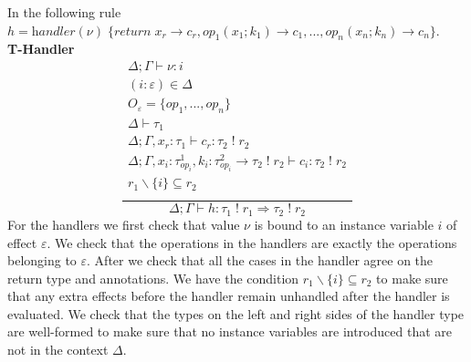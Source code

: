 \documentclass[12pt]{article}
\newcommand\eff[0]{\varepsilon}
\newcommand\Op[0]{O}
\newcommand\op[0]{op}
\newcommand\pty[1]{\ty^1_{#1}}
\newcommand\rty[1]{\ty^2_{#1}}
\newcommand\ty[0]{\tau}
\newcommand\tarr[2]{#1 \rightarrow #2}
\newcommand\thandler[2]{#1 \Rightarrow #2}
\newcommand\aty[2]{#1 \; ! \; #2}
\newcommand\val[0]{\nu}
\newcommand\vhandleri[2]{\textit{handler} ( #1 ) \; \{#2\}}
\newcommand\comp[0]{c}
\begin{document}
\newpage
In the following rule \\$h = 
	\vhandleri{\val}{
		\textit{return} \; x_r \rightarrow \comp_r,
		\op_1(x_1 ; k_1) \rightarrow \comp_1,
		...,
		\op_n(x_n ; k_n) \rightarrow \comp_n
	}$.\\
\textbf{T-Handler}
\[\frac{
	\begin{array}{l}
	\Delta;\Gamma \vdash \val : i \\
	(i:\eff)\in\Delta \\
	\Op_\eff = \{ op_1, ..., op_n \} \\
	\Delta \vdash \ty_1 \\
	\Delta;\Gamma, x_r : \ty_1 \vdash \comp_r : \aty{\ty_2}{r_2} \\
	\Delta;\Gamma, x_i : \pty{\op_i}, k_i : \tarr{\rty{\op_i}}{\aty{\ty_2}{r_2}} \vdash \comp_i : \aty{\ty_2}{r_2} \\
	r_1 \backslash \{ i \} \subseteq r_2 \\
	\end{array}
}{
	\Delta;\Gamma \vdash h :
	\thandler{\aty{\ty_1}{r_1}}{\aty{\ty_2}{r_2}}
}\]
For the handlers we first check that value $\val$ is bound to an instance variable $i$ of effect $\eff$.
We check that the operations in the handlers are exactly the operations belonging to $\eff$.
After we check that all the cases in the handler agree on the return type and annotations.
We have the condition $r_1 \backslash \{ i \} \subseteq r_2$ to make sure that any extra effects before the handler remain unhandled after the handler is evaluated.
We check that the types on the left and right sides of the handler type are well-formed to make sure that no instance variables are introduced that are not in the context $\Delta$.
\end{document}
